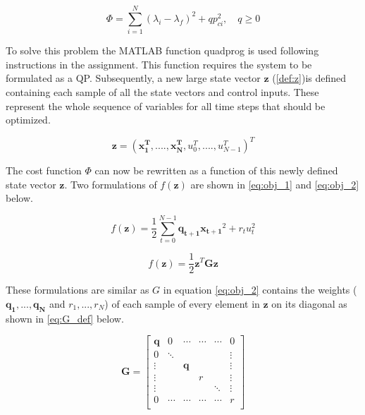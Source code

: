 \documentclass[a4paper, 12pt]{article}\usepackage[utf8]{inputenc}
\begin{document}
\begin{equation}\label{eq:cost}
    \Phi=\sum_{i=1}^{N}(\lambda_i-\lambda_f)^2+qp_{ci}^2, \quad q\geq 0
\end{equation}

To solve this problem the MATLAB function quadprog is used following instructions in the assignment. This function requires the system to be formulated as a QP. Subsequently, a new large state vector $\boldsymbol{z}$ (\ref{def:z})is defined containing each sample of all the state vectors and control inputs. These represent the whole sequence of variables for all time steps that should be optimized. 

\begin{equation}\label{def:z}
    \boldsymbol{z}=(\boldsymbol{x_1^{T}},....,\boldsymbol{x_N^{T}},u_0^{T},....,u_{N-1}^{T})^T
\end{equation}

The cost function $\Phi$ can now be rewritten as a function of this newly defined state vector $\boldsymbol{z}$. Two formulations of $f(\boldsymbol{z})$ are shown in \ref{eq:obj_1} and \ref{eq:obj_2} below.

\begin{equation}\label{eq:obj_1}
    f(\boldsymbol{z})=\frac{1}{2}\sum_{t=0}^{N-1}\boldsymbol{q_{t+1}}\boldsymbol{x_{t+1}}^2+r_tu_t^2
\end{equation}


\begin{equation}\label{eq:obj_2}
    f(\boldsymbol{z}) = \frac{1}{2} \boldsymbol{z}^T \boldsymbol{G} \boldsymbol{z} 
\end{equation}

These formulations are similar as $G$ in equation \ref{eq:obj_2} contains the weights ($\boldsymbol{q_1}, ..., \boldsymbol{q_N}$ and $r_1, ..., r_N$) of each sample of every element in $\boldsymbol{z}$ on its diagonal as shown in \ref{eq:G_def} below. 

\begin{equation}\label{eq:G_def}
    \boldsymbol{G} =
    \begin{bmatrix}
        \boldsymbol{q} & 0 & \cdots & \cdots & \cdots & 0\\
         0 & \ddots & & & & \vdots\\
         \vdots & & \boldsymbol{q} & & & \vdots\\
         \vdots & & & r  & & \vdots\\
         \vdots & & & & \ddots & \vdots\\
         0 & \cdots & \cdots & \cdots & \cdots & r \\
        
    \end{bmatrix}
\end{equation}
\end{document}
